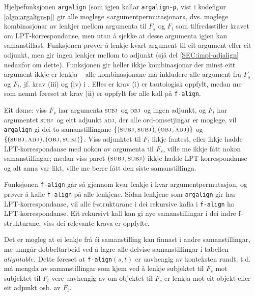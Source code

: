 \documentclass[11pt,a4paper,oneside,draft]{book}
\newcommand{\F}[2]{\textsc{#1}\ensuremath{_{#2}}}
\newcommand{\OBJ}{\F{obj}{}}
\newcommand{\OBJs}{\F{obj~}{}}
\newcommand{\ADJ}{\F{adj}{}}
\newcommand{\SUBJ}{\F{subj}{}}
\newcommand{\SUBJs}{\F{subj~}{}}
\begin{document}
Hjelpefunksjonen \texttt{argalign} (som igjen kallar \texttt{argalign-p}, vist i
kodefigur \ref{algo:argalign-p}) gir alle moglege
«argumentpermutasjonar», dvs. moglege kombinasjonar av lenkjer mellom
argumenta til $F_s$ og $F_t$ som tilfredsstiller kravet om
LPT-korrespondanse, men utan å sjekke at desse argumenta igjen kan
samanstillast. Funksjonen prøver å lenkje kvart argument til eit
argument eller eit adjunkt, men gir ingen lenkjer mellom to adjunkt
(sjå del \ref{SEC:impl-adjalign} nedanfor om dette). Funksjonen gir
heller ikkje kombinasjonar der minst eitt argument ikkje er lenkja --
alle kombinasjonane må inkludere alle argument frå $F_s$ og $F_t$,
jf. krav (iii) og (iv) i \citet[s.~75]{dyvik2009lmp}. Elles er krav
(i) er tautologisk oppfylt, medan me som nemnt føreset at krav (ii) er
oppfylt før alle kall på \texttt{f-align}.

Eit døme: viss $F_s$ har argumenta \SUBJs og \OBJs og ingen adjunkt,
og $F_t$ har argumentet \SUBJs og eitt adjunkt \ADJ, der alle
ord-omsetjingar er moglege, vil \texttt{argalign} gi dei to samanstillingane
$\{(\SUBJ,\SUBJ), (\OBJ,\ADJ)\}$ og $\{(\SUBJ,\ADJ),
(\OBJ,\SUBJ)\}$. Viss adjunktet til $F_t$ ikkje fantest, eller ikkje
hadde LPT-korrespondanse med nokon av argumenta til $F_s$, ville me
ikkje fått nokon samanstillingar; medan viss paret $(\SUBJ,\SUBJ)$
ikkje hadde LPT-korrespondanse og alt anna var likt, ville me berre
fått den siste samanstillinga.

Funksjonen \texttt{f-align} går så gjennom kvar lenkje i kvar
argumentpermutasjon, og prøver å kalle \texttt{f-align} på alle
lenkjene. Sidan lenkjene som \texttt{argalign} gir har LPT-korrespondanse,
vil alle f-strukturane i dei rekursive kalla i \texttt{f-align} ha
LPT-korrespondanse. Eit rekursivt kall kan gi nye samanstillingar i
dei indre f-strukturane, viss dei relevante krava er oppfylte.

Det er mogleg at ei lenkje frå éi samanstilling kan finnast i andre
samanstillingar, me unngår dobbeltarbeid ved å lagre alle delvise
samanstillingar i tabellen $aligntable$. Dette føreset at
\texttt{f-align}$(s,t)$ er uavhengig av konteksten rundt; t.d. må
mengda av samanstillingar som kjem ved å lenkje subjektet til $F_s$
mot subjektet til $F_t$ vere uavhengig av om objektet til $F_s$ er
lenkja mot eit objekt eller eit adjunkt osb. av $F_t$. 

  
\end{document}
